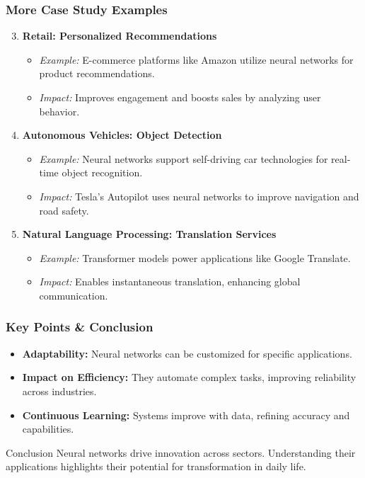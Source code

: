 \documentclass[aspectratio=169]{beamer}
\begin{document}
\begin{frame}[fragile]
    \frametitle{More Case Study Examples}
    \begin{enumerate}
        \setcounter{enumi}{2} %
        \item \textbf{Retail: Personalized Recommendations}
            \begin{itemize}
                \item \textit{Example:} E-commerce platforms like Amazon utilize neural networks for product recommendations.
                \item \textit{Impact:} Improves engagement and boosts sales by analyzing user behavior.
            \end{itemize}
        \item \textbf{Autonomous Vehicles: Object Detection}
            \begin{itemize}
                \item \textit{Example:} Neural networks support self-driving car technologies for real-time object recognition.
                \item \textit{Impact:} Tesla's Autopilot uses neural networks to improve navigation and road safety.
            \end{itemize}
        \item \textbf{Natural Language Processing: Translation Services}
            \begin{itemize}
                \item \textit{Example:} Transformer models power applications like Google Translate.
                \item \textit{Impact:} Enables instantaneous translation, enhancing global communication.
            \end{itemize}
    \end{enumerate}
\end{frame}

\begin{frame}[fragile]
    \frametitle{Key Points & Conclusion}
    \begin{itemize}
        \item \textbf{Adaptability:} Neural networks can be customized for specific applications.
        \item \textbf{Impact on Efficiency:} They automate complex tasks, improving reliability across industries.
        \item \textbf{Continuous Learning:} Systems improve with data, refining accuracy and capabilities.
    \end{itemize}
    \begin{block}{Conclusion}
        Neural networks drive innovation across sectors. Understanding their applications highlights their potential for transformation in daily life.
    \end{block}
\end{frame}
\end{document}
